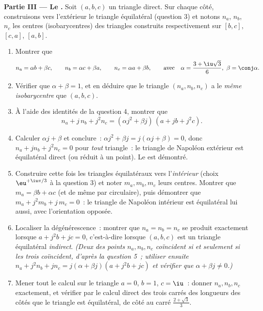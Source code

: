 \begin{problem}
\medskip
\noindent\textbf{Partie III --- Le .} Soit $(a,
b, c)$ un triangle direct. Sur chaque côté, construisons vers
l'extérieur le triangle équilatéral (question 3) et notons $n_a$,
$n_b$, $n_c$ les centres (isobarycentres) des triangles construits
respectivement sur $[b, c]$, $[c, a]$, $[a, b]$.
\begin{enumerate}[resume]
  \item Montrer que
        \[
        n_a = \alpha b + \beta c, \qquad
        n_b = \alpha c + \beta a, \qquad
        n_c = \alpha a + \beta b,
        \qquad\text{avec}\quad
        \alpha = \frac{3 + \iu\sqrt3}{6},\ \beta = \conj\alpha .
        \]
  \item Vérifier que $\alpha + \beta = 1$, et en déduire que le
        triangle $(n_a, n_b, n_c)$ a le \emph{même isobarycentre}
        que $(a, b, c)$.
  \item À l'aide des identités de la question 4, montrer que
        \[
        n_a + j\,n_b + j^2 n_c
        = (\alpha j^2 + \beta j)\,(a + jb + j^2c) .
        \]
  \item Calculer $\alpha j + \beta$ et conclure~: $\alpha j^2 +
        \beta j = j(\alpha j + \beta) = 0$, donc $n_a + j n_b + j^2
        n_c = 0$ pour \emph{tout} triangle~: le triangle de Napoléon
        extérieur est équilatéral direct (ou réduit à un point). Le
         est démontré.
  \item Construire cette fois les triangles équilatéraux vers
        l'\emph{intérieur} (choix $\eu^{+\iu\pi/3}$ à la question 3)
        et noter $m_a, m_b, m_c$ leurs centres. Montrer que $m_a =
        \beta b + \alpha c$ (et de même par  circulaire),
        puis démontrer que $m_a + j^2 m_b + j\,m_c = 0$~: le
        triangle de Napoléon intérieur est équilatéral lui aussi,
        avec l'orientation opposée.
  \item Localiser la dégénérescence~: montrer que $n_a = n_b = n_c$
        se produit exactement lorsque $a + j^2 b + jc = 0$,
        c'est-à-dire lorsque $(a, b, c)$ est un triangle équilatéral
        \emph{indirect}. \emph{(Deux des points $n_a, n_b, n_c$
        coïncident si et seulement si les trois coïncident, d'après
        la question 5~; utiliser ensuite $n_a + j^2 n_b + j n_c =
        j(\alpha + \beta j)(a + j^2b + jc)$ et vérifier que $\alpha
        + \beta j \neq 0$.)}
  \item Mener tout le calcul sur le triangle $a = 0$, $b = 1$, $c =
        \iu$~: donner $n_a, n_b, n_c$ exactement, et vérifier par le
        calcul direct des trois carrés des longueurs des côtés que
        le triangle est équilatéral, de côté au carré $\frac{2 +
        \sqrt3}{3}$.
\end{enumerate}


\end{problem}
